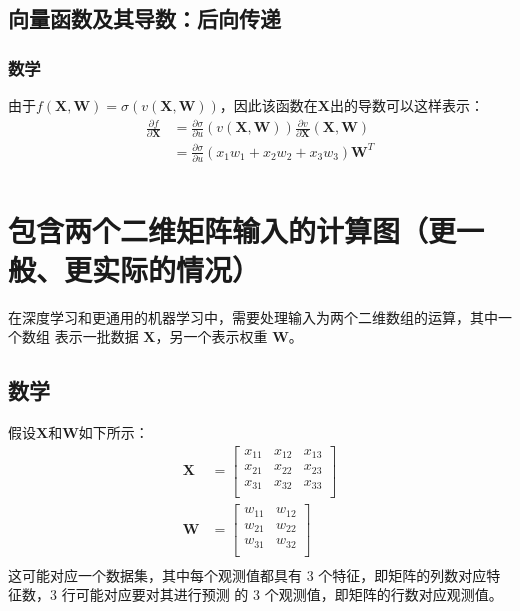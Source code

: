 \subsection*{向量函数及其导数：后向传递}
\subsubsection*{数学}
由于$f(\bm{X}, \bm{W})=\sigma(v(\bm{X}, \bm{W}))$，因此该函数在$\bm{X}$出的导数可以这样表示：
\begin{equation*}
    \begin{aligned}
        \frac{\partial f}{\partial \bm{X}} & =\frac{\partial \sigma}{\partial u}(v(\bm{X}, \bm{W})) \frac{\partial v}{\partial \bm{X}}(\bm{X},\bm{W}) \\
                                           & =\frac{\partial \sigma}{\partial u}(x_1w_1 + x_2  w_2 + x_3w_3)\bm{W}^T                                  \\
    \end{aligned}
\end{equation*}
\section{包含两个二维矩阵输入的计算图（更一般、更实际的情况）}
在深度学习和更通用的机器学习中，需要处理输入为两个二维数组的运算，其中一个数组
表示一批数据 $\bm{X}$，另一个表示权重 $\bm{W}$。
\subsection*{数学}
假设$\bm{X}$和$\bm{W}$如下所示：
\begin{equation*}
    \begin{aligned}
        \bm{X} & =\left[\begin{matrix}
                                x_{11} & x_{12} & x_{13} \\
                                x_{21} & x_{22} & x_{23} \\
                                x_{31} & x_{32} & x_{33} \\
                            \end{matrix} \right] \\
        \bm{W} & =\left[ \begin{matrix}
                                 w_{11} & w_{12} \\
                                 w_{21} & w_{22} \\
                                 w_{31} & w_{32} \\
                             \end{matrix}  \right]   \\
    \end{aligned}
\end{equation*}
这可能对应一个数据集，其中每个观测值都具有 3 个特征，即矩阵的列数对应特征数，3 行可能对应要对其进行预测
的 3 个观测值，即矩阵的行数对应观测值。

